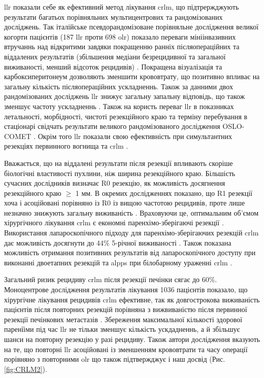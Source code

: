 \begin{refsection}
\begin{figure}[!ht]
\end{figure}


\acrshort{llr} показали себе як ефективний метод лікування \acrshort{crlm}, що підтрержджують результати багатьох порівняльних мультицентрових та рандомізованих досліджень. Так італійське псевдорандомізоване порівняльне дослідження великої когорти пацієнтів (187 \acrshort{llr} проти 698 \acrshort{olr})  показало переваги мініінвазивних втручаннь над відкритими завдяки покращенню ранніх післяопераційних та віддалених результатів (збільшення медіани безрецидивної та загальної виживаності, менший відсоток рецидивів) \cite{Ratti2018a}. Покращена візуалізація та карбоксиперитонеум дозволяють зменшити крововтрату, що позитивно впливає на загальну кількість післяопераційних ускладненнь. Також за данними двох рандомізованих досліджень \acrshort{llr} знижує загальну запальну відповідь, що також зменшує частоту ускладненнь \cite{Kasai2018, Fretland2015}. Також на користь переваг \acrshort{llr} в показниках летальності, морбідності, чистоті резекційного краю та терміну перебування в стаціонарі свідчать результати великого рандомізованого дослідження OSLO-COMET \cite{Fretland2018a}. Окрім того \acrshort{llr} показали свою ефективність при симультантних резекціях первинного вогнища та \acrshort{crlm} \cite{Moris2019}.

Вважається, що на віддалені результати після резекції впливають скоріше біологічні властивості пухлини, ніж ширина резекційного краю. Більшість сучасних дослідників визначає R0 резекцію, як можливість досягнення резекційного краю $\geq$ 1 мм. В окремих дослідженнях показано, що R1 резекції хоча і асоційовані порівняно із R0 із вищою частотою рецидивів, проте лише незначно знижують загальну виживаність \cite{DeHaas2008}. Враховуючи це, оптимальним об'ємом хірургічного лікування \acrshort{crlm} є економні паренхімо-зберігаючі резекції \cite{Matsumura2016, Moris2017}. Використання лапароскопічного підходу для паренхімо-зберігаючих резекцій \acrshort{crlm} дає можливість досягнути до 44\% 5-річної виживаності \cite{Aghayan2018}. Також показана можливість отримання позитивних результатів від лапароскопічного доступу при виконанні двоетапних резекцій та \acrshort{alpps} при білобарному ураженні \acrshort{crlm} \cite{Okumura2019, Melandro2019}.

Загальний ризик рецидиву \acrshort{crlm} після резекції печінки сягає до 60\%. Моноцентрове дослідження результатів лікування 1036 пацієнтів показало, що хірургічне лікування рецидивів \acrshort{crlm} ефективне, так як  довгострокова виживаність пацієнтів після повторних резекцій порівняна з вижвиваністю після первинної резекції печінкових метастазів \cite{Wicherts2013}. Збереження максимальної кількості здорової паренїіми під час \acrshort{llr} не тільки зменшує кількість ускдадненнь, а й збільшує шанси на повторну резекцію у разі рецидиву. Також автори дослідження вказують на те, що повторні \acrshort{llr} асоційовані із зменшенням крововтрати та часу операції порівняно з повторними \acrshort{olr} що також підтвержджує і наш досвід (Рис. \ref{fig:CRLM2}).


\end{refsection}
